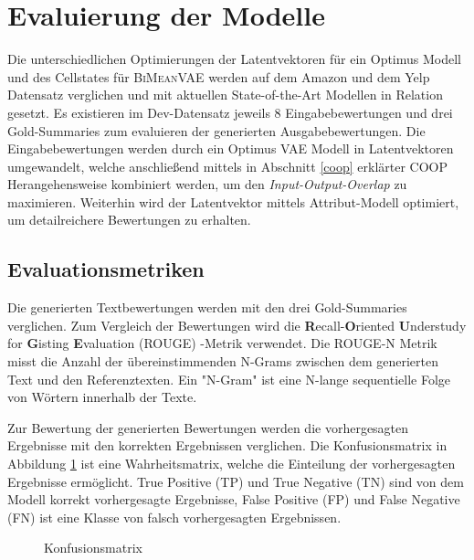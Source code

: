 \section{Evaluierung der Modelle}\raggedbottom
\label{evalmetric}
Die unterschiedlichen Optimierungen der Latentvektoren für ein Optimus Modell und des Cellstates für \textsc{BiMeanVAE} werden auf dem Amazon und dem Yelp Datensatz verglichen und mit aktuellen State-of-the-Art Modellen in Relation gesetzt.
Es existieren im Dev-Datensatz jeweils 8 Eingabebewertungen und drei Gold-Summaries zum evaluieren der generierten Ausgabebewertungen.
Die Eingabebewertungen werden durch ein Optimus VAE Modell in Latentvektoren umgewandelt, welche anschließend mittels in Abschnitt \ref{coop} erklärter COOP Herangehensweise kombiniert werden, um den \textit{Input-Output-Overlap} zu maximieren. 
Weiterhin wird der Latentvektor mittels Attribut-Modell optimiert, um detailreichere Bewertungen zu erhalten.


\subsection{Evaluationsmetriken}
Die generierten Textbewertungen werden mit den drei Gold-Summaries verglichen.
Zum Vergleich der Bewertungen wird die \textbf{R}ecall-\textbf{O}riented \textbf{U}nderstudy for \textbf{G}isting \textbf{E}valuation (ROUGE) -Metrik verwendet.
Die ROUGE-N Metrik misst die Anzahl der übereinstimmenden N-Grams zwischen dem generierten Text und den Referenztexten. 
Ein "N-Gram" ist eine N-lange sequentielle Folge von Wörtern innerhalb der Texte. 

Zur Bewertung der generierten Bewertungen werden die vorhergesagten Ergebnisse mit den korrekten Ergebnissen verglichen. 
Die Konfusionsmatrix in Abbildung \ref{confusionmatrix} ist eine Wahrheitsmatrix, welche die Einteilung der vorhergesagten Ergebnisse ermöglicht. 
True Positive (TP) und True Negative (TN) sind von dem Modell korrekt vorhergesagte Ergebnisse, False Positive (FP) und False Negative (FN) ist eine Klasse von falsch vorhergesagten Ergebnissen.


\begin{figure}[h!]
    \centering
{}
\caption{Konfusionsmatrix}
\label{confusionmatrix}
\end{figure}

